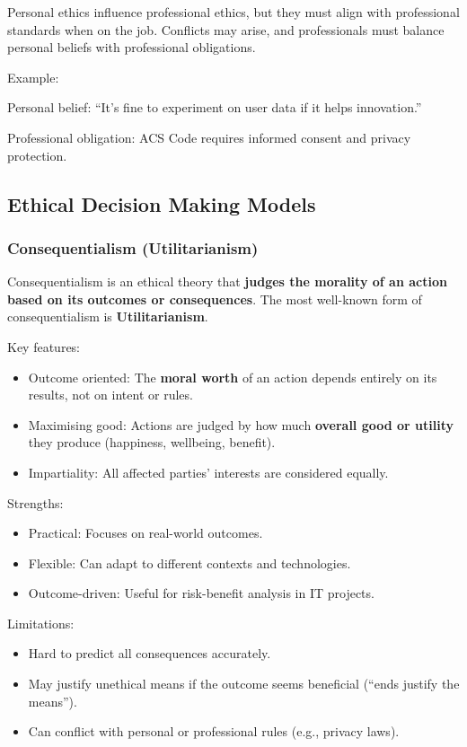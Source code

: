 Personal ethics influence professional ethics, but they must align with professional standards when on the job. Conflicts may arise, and professionals must balance personal beliefs with professional obligations.

Example:

Personal belief: “It’s fine to experiment on user data if it helps innovation.”

Professional obligation: ACS Code requires informed consent and privacy protection.

\subsection{Ethical Decision Making Models}

\indent 

\subsubsection{Consequentialism (Utilitarianism)}

Consequentialism is an ethical theory that \textbf{judges the morality of an action based on its outcomes or consequences}. The most well-known form of consequentialism is \textbf{Utilitarianism}.

Key features:

\begin{itemize}
    \item Outcome oriented: The \textbf{moral worth} of an action depends entirely on its results, not on intent or rules.
    \item Maximising good: Actions are judged by how much \textbf{overall good or utility} they produce (happiness, wellbeing, benefit).
    \item Impartiality: All affected parties’ interests are considered equally.
\end{itemize}

Strengths:

\begin{itemize}
    \item Practical: Focuses on real-world outcomes.
    \item Flexible: Can adapt to different contexts and technologies.
    \item Outcome-driven: Useful for risk-benefit analysis in IT projects.
\end{itemize}

Limitations:

\begin{itemize}
    \item Hard to predict all consequences accurately.
    \item May justify unethical means if the outcome seems beneficial (“ends justify the means”).
    \item Can conflict with personal or professional rules (e.g., privacy laws).
\end{itemize}

